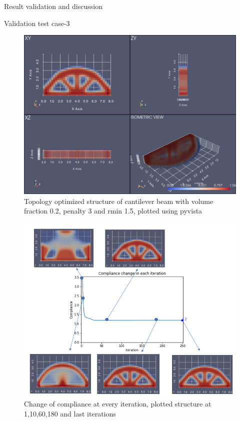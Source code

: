 \documentclass[a4paper,12pt,times]{article}
\begin{document}
\begin{section}{Result validation and discussion}
\begin{subsection}{Validation test case-3}
\begin{figure}[H]
\centering
\includegraphics[width=1\linewidth]{Numerical_result_full_OC_03.jpg}
\centering
\caption{Topology optimized structure of cantilever beam with volume fraction 0.2, penalty 3 and rmin 1.5, plotted using pyvista}
\label{VC-06.3}
\end{figure}
\begin{figure}[H]
\centering
\includegraphics[width=1\linewidth]{Compliance_chg_OC_03.png}
\centering
\caption{Change of compliance at every iteration, plotted structure at 1,10,60,180 and last iterations}
\label{VC-06.4}
\end{figure}

\end{subsection}
\end{section}
\end{document}

